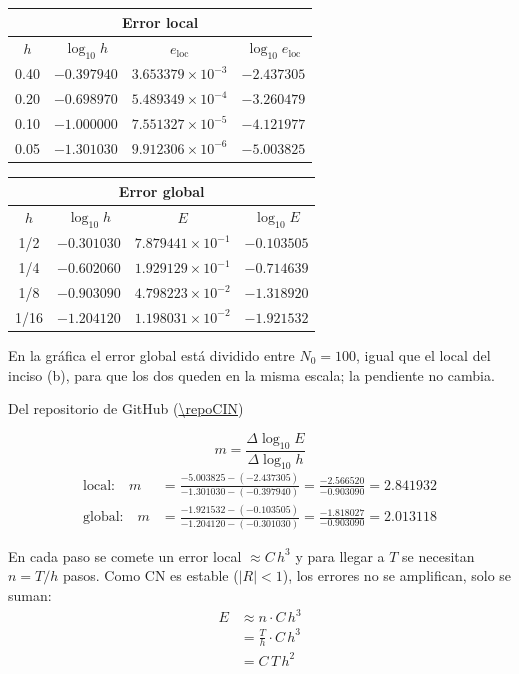 
\begin{center}
	\begin{tabular}{cccc}\toprule
		\multicolumn{4}{c}{Error local}\\\midrule
		$h$ & $\log_{10} h$ & $e_{\mathrm{loc}}$ & $\log_{10} e_{\mathrm{loc}}$\\\midrule
		0.40 & $-0.397940$ & $3.653379\times10^{-3}$ & $-2.437305$\\
		0.20 & $-0.698970$ & $5.489349\times10^{-4}$ & $-3.260479$\\
		0.10 & $-1.000000$ & $7.551327\times10^{-5}$ & $-4.121977$\\
		0.05 & $-1.301030$ & $9.912306\times10^{-6}$ & $-5.003825$\\\bottomrule
	\end{tabular}
	
	\bigskip
	\begin{tabular}{cccc}\toprule
		\multicolumn{4}{c}{Error global}\\\midrule
		$h$ & $\log_{10} h$ & $E$ & $\log_{10} E$\\\midrule
		1/2  & $-0.301030$ & $7.879441\times10^{-1}$ & $-0.103505$\\
		1/4  & $-0.602060$ & $1.929129\times10^{-1}$ & $-0.714639$\\
		1/8  & $-0.903090$ & $4.798223\times10^{-2}$ & $-1.318920$\\
		1/16 & $-1.204120$ & $1.198031\times10^{-2}$ & $-1.921532$\\\bottomrule
	\end{tabular}
\end{center}

En la gráfica el error global está dividido entre $N_0 = 100$, igual que el local del inciso (b), para que los dos queden en la misma escala; la pendiente no cambia.


Del repositorio de GitHub (\url{\repoCIN})

\[
m = \frac{\Delta \log_{10} E}{\Delta \log_{10} h}
\]
\begin{align*}
	\text{local:}\quad  m &= \frac{-5.003825 - (-2.437305)}{-1.301030 - (-0.397940)}
	= \frac{-2.566520}{-0.903090} = 2.841932\\
	\text{global:}\quad m &= \frac{-1.921532 - (-0.103505)}{-1.204120 - (-0.301030)}
	= \frac{-1.818027}{-0.903090} = 2.013118
\end{align*}

En cada paso se comete un error local $\approx C\,h^3$ y para llegar a $T$ se necesitan $n = T/h$ pasos. Como CN es
estable ($|R| < 1$), los errores no se amplifican, solo se suman:
\begin{align*}
	E &\approx n \cdot C\,h^3\\
	&= \frac{T}{h}\cdot C\,h^3\\
	&= C\,T\,h^2
\end{align*}

